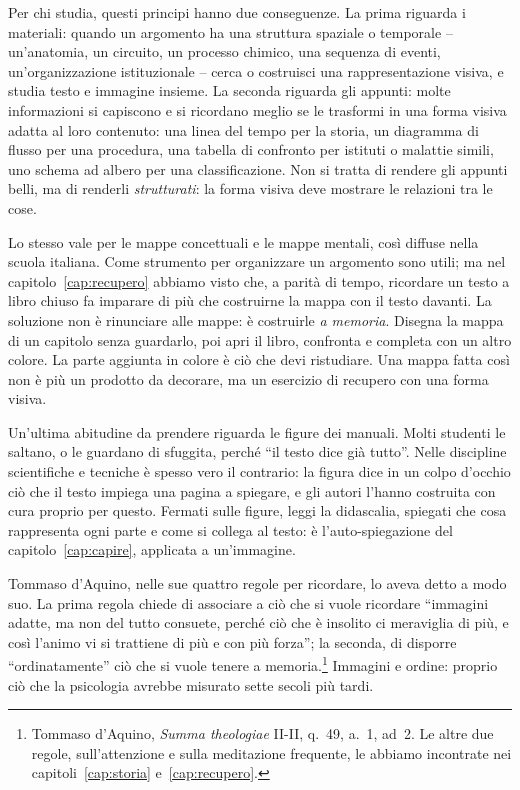 Per chi studia, questi principi hanno due conseguenze. La prima
riguarda i materiali: quando un argomento ha una struttura spaziale o
temporale -- un'anatomia, un circuito, un processo chimico, una
sequenza di eventi, un'organizzazione istituzionale -- cerca o costruisci
una rappresentazione visiva, e studia testo e immagine insieme. La
seconda riguarda gli appunti: molte informazioni si capiscono e si
ricordano meglio se le trasformi in una forma visiva adatta al loro
contenuto: una linea del tempo per la storia, un diagramma di flusso per
una procedura, una tabella di confronto per istituti o malattie simili,
uno schema ad albero per una classificazione. Non si tratta di rendere
gli appunti belli, ma di renderli \emph{strutturati}: la forma visiva
deve mostrare le relazioni tra le cose.

Lo stesso vale per le mappe concettuali e le mappe mentali, così
diffuse nella scuola italiana. Come strumento per organizzare un
argomento sono utili; ma nel capitolo~\ref{cap:recupero} abbiamo visto
che, a parità di tempo, ricordare un testo a libro chiuso fa imparare
di più che costruirne la mappa con il testo davanti. La soluzione non è
rinunciare alle mappe: è costruirle \emph{a memoria}. Disegna la mappa
di un capitolo senza guardarlo, poi apri il libro, confronta e
completa con un altro colore. La parte aggiunta in colore è ciò che
devi ristudiare. Una mappa fatta così non è più un prodotto da
decorare, ma un esercizio di recupero con una forma visiva.

Un'ultima abitudine da prendere riguarda le figure dei manuali. Molti
studenti le saltano, o le guardano di sfuggita, perché \enquote{il testo
dice già tutto}. Nelle discipline scientifiche e tecniche è spesso
vero il contrario: la figura dice in un colpo d'occhio ciò che il testo
impiega una pagina a spiegare, e gli autori l'hanno costruita con cura
proprio per questo. Fermati sulle figure, leggi la didascalia, spiegati
che cosa rappresenta ogni parte e come si collega al testo: è
l'auto-spiegazione del capitolo~\ref{cap:capire}, applicata a
un'immagine.

Tommaso d'Aquino, nelle sue quattro regole per ricordare, lo aveva
detto a modo suo. La prima regola chiede di associare a ciò che si
vuole ricordare \enquote{immagini adatte, ma non del tutto consuete,
perché ciò che è insolito ci meraviglia di più, e così l'animo vi si
trattiene di più e con più forza}; la seconda, di disporre
\enquote{ordinatamente} ciò che si vuole tenere a
memoria.\footnote{Tommaso d'Aquino, \emph{Summa theologiae} II-II,
q.~49, a.~1, ad~2. Le altre due regole, sull'attenzione e sulla
meditazione frequente, le abbiamo incontrate nei
capitoli~\ref{cap:storia} e~\ref{cap:recupero}.} Immagini e ordine:
proprio ciò che la psicologia avrebbe misurato sette secoli più tardi.

